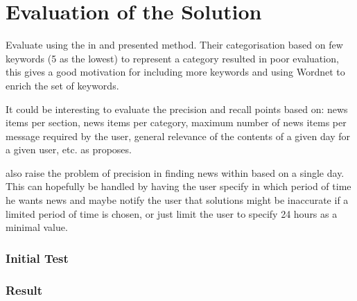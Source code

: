 \chapter{Evaluation of the Solution} %
\label{ch:evaluation}

Evaluate using the in \cite{Sections-categories-and-keywords-as-interest-specification-tools-for-personalised-news-services.pdf} and \cite{Evaluating-a-User-Model-Based-Personalisation-Architecture-for-Digital-News-Services.pdf} presented method. Their categorisation based on few keywords (5 as the lowest) to represent a category resulted in poor evaluation, this gives a good motivation for including more keywords and using Wordnet to enrich the set of keywords.

It could be interesting to evaluate the precision and recall points based on: news items per section, news items per category, maximum number of news items per message required by the user, general relevance of the contents of a given day for a given user, etc. as \cite{Sections,-categories-and-keywords-as-interest-specification-tools-for-personalised-news-services.pdf} proposes.

\cite{Sections,-categories-and-keywords-as-interest-specification-tools-for-personalised-news-services.pdf} also raise the problem of precision in finding news within based on a single day. This can hopefully be handled by having the user specify in which period of time he wants news and maybe notify the user that solutions might be inaccurate if a limited period of time is chosen, or just limit the user to specify 24 hours as a minimal value.


\subsection{Initial Test}

\subsection{Result}


